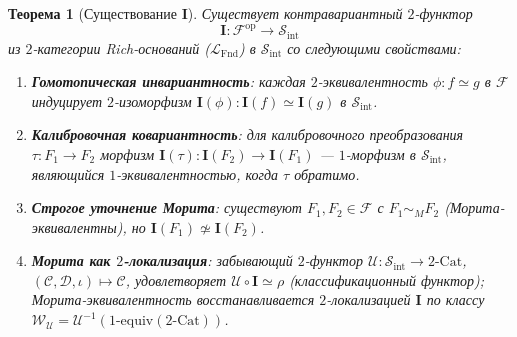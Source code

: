 \documentclass[11pt]{article}
\theoremstyle{plain}
\newtheorem{theorem}{Теорема}[section]
\theoremstyle{definition}
\newcommand{\cS}{\mathcal{S}}
\newcommand{\cF}{\mathcal{F}}
\newcommand{\cC}{\mathcal{C}}
\newcommand{\cD}{\mathcal{D}}
\newcommand{\LFnd}{\mathcal{L}_{\mathrm{Fnd}}}
\newcommand{\Sint}{\cS_{\mathrm{int}}}
\newcommand{\Cat}{\mathrm{Cat}}
\newcommand{\II}{\mathbf{I}}
\newcommand{\cU}{\mathcal{U}}
\begin{document}
\begin{theorem}[Существование $\II$]\label{thm:I-existence}
Существует контравариантный $2$-функтор
\[ \II : \cF^{\mathrm{op}} \to \Sint \]
из $2$-категории Rich-оснований ($\LFnd$) в $\Sint$ со следующими свойствами:
\begin{enumerate}
\item[\textbf{(I-1)}] \textbf{Гомотопическая инвариантность}: каждая $2$-эквивалентность $\phi : f \simeq g$ в $\cF$ индуцирует $2$-изоморфизм $\II(\phi) : \II(f) \simeq \II(g)$ в $\Sint$.
\item[\textbf{(I-2)}] \textbf{Калибровочная ковариантность}: для калибровочного преобразования $\tau : F_1 \to F_2$ морфизм $\II(\tau) : \II(F_2) \to \II(F_1)$ — $1$-морфизм в $\Sint$, являющийся $1$-эквивалентностью, когда $\tau$ обратимо.
\item[\textbf{(I-3)}] \textbf{Строгое уточнение Морита}: существуют $F_1, F_2 \in \cF$ с $F_1 \sim_M F_2$ (Морита-эквивалентны), но $\II(F_1) \not\simeq \II(F_2)$.
\item[\textbf{(I-4)}] \textbf{Морита как $2$-локализация}: забывающий $2$-функтор $\cU : \Sint \to 2\text{-}\Cat$, $(\cC, \cD, \iota) \mapsto \cC$, удовлетворяет $\cU \circ \II \simeq \rho$ (классификационный функтор); Морита-эквивалентность восстанавливается $2$-локализацией $\II$ по классу $\mathcal{W}_\cU = \cU^{-1}(1\text{-equiv}(2\text{-}\Cat))$.
\end{enumerate}
\end{theorem}
\end{document}

